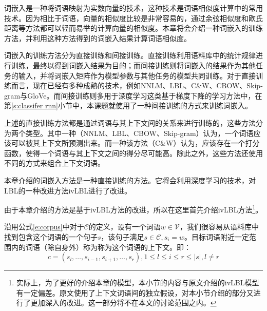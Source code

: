 
词嵌入是一种将词语映射为实数向量的技术，这种技术是词语相似度计算中的常用技术。因为相比于词语，向量的相似度比较是非常容易的，通过余弦相似度和欧氏距离等方法都可以轻而易举的计算向量的相似度。本章将会介绍一种词嵌入的训练方法，并利用这种方法得到的词嵌入结果计算词语相似度。

词嵌入的训练方法分为直接训练和间接训练。直接训练利用语料库中的统计规律进行训练，最终以得到词嵌入结果为目的；而间接训练则将词嵌入的结果作为其他任务的输入，并将词嵌入矩阵作为模型参数与其他任务的模型共同训练。对于直接训练而言，现在已经有多种成熟的技术，例如NNLM、LBL、C\&W、CBOW、Skip-gram与GloVe。而间接训练则多用于深度学习这类基于梯度下降的学习方法中，在第\ref{s:classifer rnn}小节中，本课题就使用了一种间接训练的方式来训练词嵌入。

上述的直接训练方法都是通过词语与其上下文间的关系来进行训练的，这些方法分为两个类型。其中一种（NNLM、LBL、CBOW、Skip-gram）认为，一个词语应该可以被其上下文所预测出来。而一种该方法（C\&W）认为，应该存在一个打分函数，使得一个词语与其上下文之间的得分尽可能高。除此之外，这些方法还使用不同的方式来组合上下文词语。

本章介绍的词嵌入方法是一种直接训练的方法。它将会利用深度学习的技术，对LBL的一种改进方法ivLBL进行了改进。



由于本章介绍的方法是基于ivLBL方法的改进，所以在这里首先介绍ivLBL方法\footnote{实际上，为了更好的介绍本章的模型，本小节的内容与原文介绍的ivLBL模型有一定偏差。原文使用了上下文词语间的独立假设，对本小节介绍的部分又进行了更加深入的改进。这一部分将不在本文的讨论范围之内。}。

沿用公式\ref{e:corpus}中对于$\mathcal{C}$的定义，设有一个词语$w \in \mathcal{V}$，我们很容易从语料库中找到包含这个词语的一个句子$s$，该句子满足$s \in \mathcal{C}, s_i = w$。目标词语附近一定范围内的词语（除自身外）称为称为这个词语的上下文。即：
\begin{equation}
c = (s_l, \dots, s_{i - 1}, s_{i + 1}, \dots, s_r), 1 \leq l \leq i \leq r \leq |s|, l \neq r
\end{equation}

